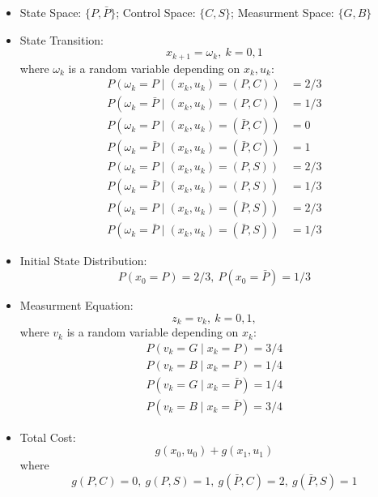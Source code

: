 \begin{itemize}
\item
State Space: $\{P,\bar{P}\}$;
Control Space: $\{C,S\}$;
Measurment Space: $\{G,B\}$
\item
State Transition:
\[
x_{k+1}=\omega_k,\ k=0,1
\]
where $\omega_k$ is a random variable depending on $x_k,u_k$:
\begin{align*}
P(\omega_k=P\mid (x_k,u_k)=(P,C))&=2/3\\
P(\omega_k=\bar{P}\mid (x_k,u_k)=(P,C))&=1/3\\
P(\omega_k=P\mid (x_k,u_k)=(\bar{P},C))&=0\\
P(\omega_k=\bar{P}\mid (x_k,u_k)=(\bar{P},C))&=1\\
P(\omega_k=P\mid (x_k,u_k)=(P,S))&=2/3\\
P(\omega_k=\bar{P}\mid (x_k,u_k)=(P,S))&=1/3\\
P(\omega_k=P\mid (x_k,u_k)=(\bar{P},S))&=2/3\\
P(\omega_k=\bar{P}\mid (x_k,u_k)=(\bar{P},S))&=1/3
\end{align*}
\item
Initial State Distribution:
\[
P(x_0=P)=2/3,\ P(x_0=\bar{P})=1/3
\]
\item
Measurment Equation:
\[
z_k=v_k,\ k=0,1,
\]
where $v_k$ is a random variable depending on $x_k$:
\begin{align*}
P(v_k=G\mid x_k=P)=3/4\\
P(v_k=B\mid x_k=P)=1/4\\
P(v_k=G\mid x_k=\bar{P})=1/4\\
P(v_k=B\mid x_k=\bar{P})=3/4
\end{align*}
\item
Total Cost:
\[
g(x_0,u_0)+g(x_1,u_1)
\]
where 
\[
g(P,C)=0,\
g(P,S)=1,\
g(\bar{P},C)=2,\
g(\bar{P},S)=1
\]
\end{itemize}

